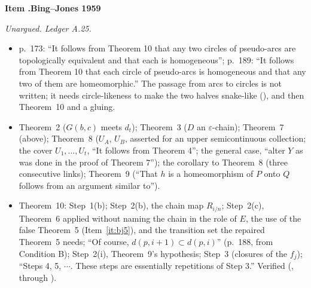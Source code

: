\documentclass[11pt]{article}
\newcounter{defect}
\newenvironment{defect}[4]{%
  \par\addvspace{10pt}\refstepcounter{defect}%
  \noindent\textbf{Item \thedefect.\enspace #1}\par\nopagebreak
  \noindent\textit{#2}\par\nopagebreak\smallskip}{\par\addvspace{6pt}}
\begin{document}
\begin{defect}{Bing--Jones 1959}{Unargued. Ledger A.25.}{0}{0}\label{it:un-bj}
\begin{itemize}
\item p.~173: ``It follows from Theorem 10 that any two circles of pseudo-arcs are topologically
  equivalent and that each is homogeneous''; p.~189: ``It follows from Theorem 10 that each circle
  of pseudo-arcs is homogeneous and that any two of them are homeomorphic.'' The passage from arcs
  to circles is not written; it needs circle-likeness to make the two halves snake-like
  (), and then Theorem~10 and a gluing.
\item Theorem~2 ($G(b,c)$ meets $d_t$); Theorem~3 ($D$ an $\varepsilon$-chain); Theorem~7 (above);
  Theorem~8 ($U_A$, $U_B$, asserted for an upper semicontinuous collection; the cover
  $U_1,\ldots,U_t$, ``It follows from Theorem 4''; the general case, ``alter $Y$ as was done in the
  proof of Theorem 7''); the corollary to Theorem~8 (three consecutive links); Theorem~9 (``That $h$
  is a homeomorphism of $P$ onto $Q$ follows from an argument similar to'').
\item Theorem~10: Step~1(b); Step~2(b), the chain map $R_{i/n}$; Step~2(c), Theorem~6 applied
  without naming the chain in the role of $E$, the use of the false Theorem~5
  (Item~\ref{it:bj5}), and the transition set the repaired Theorem~5 needs; ``Of course,
  $d(p,i+1)\subset d(p,i)$'' (p.~188, from Condition B); Step~2(i), Theorem~9's hypothesis; Step~3 (closures of the $f_j$); ``Steps
  4, 5, $\cdots$. These steps are essentially repetitions of Step 3.'' Verified
  (, through ).
\end{itemize}
\end{defect}
\end{document}
